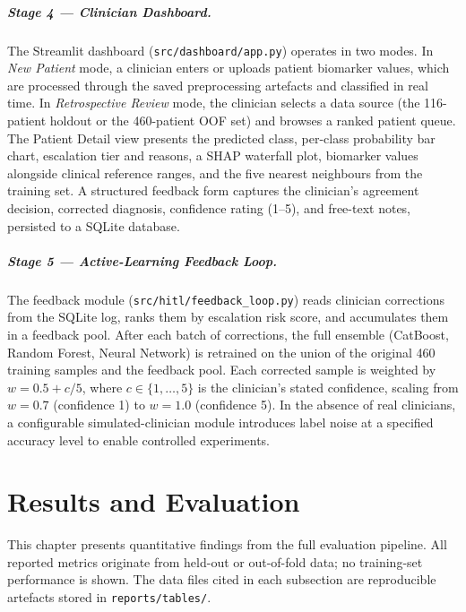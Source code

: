 \documentclass[12pt, a4paper]{report}
\begin{document}
  \paragraph{Stage 4 — Clinician Dashboard.}
  The Streamlit dashboard (\texttt{src/dashboard/app.py}) operates in two modes. In
  \emph{New Patient} mode, a clinician enters or uploads patient biomarker values,
  which are processed through the saved preprocessing artefacts and classified in
  real time. In \emph{Retrospective Review} mode, the clinician selects a data source
  (the 116-patient holdout or the 460-patient OOF set) and browses a ranked patient
  queue. The Patient Detail view presents the predicted class, per-class probability
  bar chart, escalation tier and reasons, a SHAP waterfall plot, biomarker values
  alongside clinical reference ranges, and the five nearest neighbours from the
  training set. A structured feedback form captures the clinician's agreement
  decision, corrected diagnosis, confidence rating (1--5), and free-text notes,
  persisted to a SQLite database.

  \paragraph{Stage 5 — Active-Learning Feedback Loop.}
  The feedback module (\texttt{src/hitl/feedback\_loop.py}) reads clinician
  corrections from the SQLite log, ranks them by escalation risk score, and
  accumulates them in a feedback pool. After each batch of corrections, the full
  ensemble (CatBoost, Random Forest, Neural Network) is retrained on the union of
  the original 460 training samples and the feedback pool. Each corrected sample
  is weighted by $w = 0.5 + c/5$, where $c \in \{1,\ldots,5\}$ is the clinician's
  stated confidence, scaling from $w=0.7$ (confidence 1) to $w=1.0$ (confidence 5).
  In the absence of real clinicians, a configurable simulated-clinician module
  \citep{monarch2021hitl} introduces label noise at a specified accuracy level to
  enable controlled experiments.


  \chapter{Results and Evaluation}
  \label{chap:results}

  This chapter presents quantitative findings from the full evaluation pipeline.
  All reported metrics originate from held-out or out-of-fold data; no training-set
  performance is shown.  The data files cited in each subsection are reproducible
  artefacts stored in \texttt{reports/tables/}.
\end{document}
